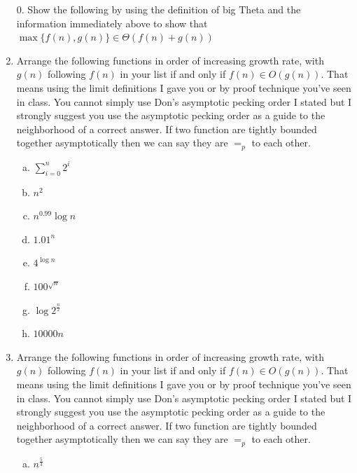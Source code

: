 \documentclass[12pt]{article}
\begin{document}
\begin{enumerate}
\item[0. ] Show the following by using the definition of big Theta and the information immediately above to show that $\max\{f(n),g(n)\}\in\Theta(f(n) + g(n))$
\newpage
\item Arrange the following functions in order of increasing growth rate, with $g(n)$ following $f(n)$ 
in your list if and only if $f(n) \in O(g(n))$. That means using the limit definitions I gave you or by proof 
technique you've seen in class. You cannot simply use Don's asymptotic pecking order I stated but I strongly 
suggest you use the asymptotic pecking order as a guide to the neighborhood of a correct answer. If two function are 
tightly bounded together asymptotically then we can say they are $=_p$ to each other.
\\
\begin{enumerate}[a)]
\item $\sum\limits_{i = 0}^{n} 2^i$\\
\item $n^2$\\
\item $n^{0.99}\log{n}$\\
\item $1.01^n$\\
\item $4^{\log{n}}$\\
\item $100^{\sqrt{n}}$\\
\item $\log{2^{\frac{n}{2}}}$\\
\item $10000n$\\
\end{enumerate}
\newpage
\item Arrange the following functions in order of increasing growth rate, with $g(n)$ following $f(n)$ in your list if and only if $f(n) \in O(g(n))$. That means using the limit definitions I gave you or by proof technique you've seen in class. You cannot simply use Don's asymptotic pecking order I stated but I strongly suggest you use the asymptotic pecking order as a guide to the neighborhood of a correct answer. If two function are 
tightly bounded together asymptotically then we can say they are $=_p$ to each other.\\
\begin{enumerate}[a)]
\item  $n^{\frac{5}{3}}$\\

\end{enumerate}
\end{enumerate}
\end{document}
